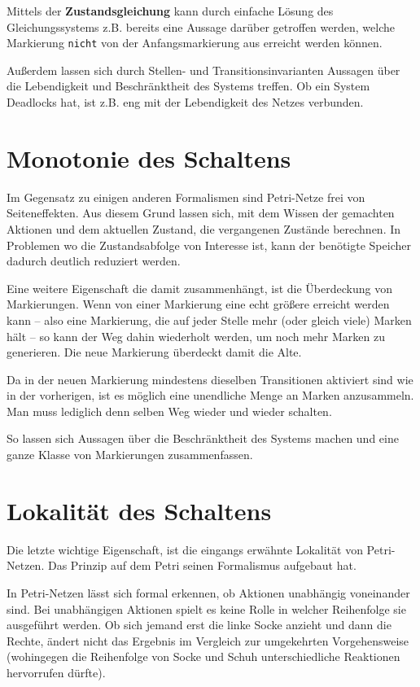 Mittels der \textbf{Zustandsgleichung} kann durch einfache Lösung des Gleichungssystems z.B. bereits eine Aussage darüber getroffen werden, welche Markierung \texttt{nicht} von der Anfangsmarkierung aus erreicht werden können.

Außerdem lassen sich durch Stellen- und Transitionsinvarianten Aussagen über die Lebendigkeit und Beschränktheit des Systems treffen.
Ob ein System Deadlocks hat, ist z.B. eng mit der Lebendigkeit des Netzes verbunden.

\section{Monotonie des Schaltens}
Im Gegensatz zu einigen anderen Formalismen sind Petri-Netze frei von Seiteneffekten.
Aus diesem Grund lassen sich, mit dem Wissen der gemachten Aktionen und dem aktuellen Zustand, die vergangenen Zustände berechnen.
In Problemen wo die Zustandsabfolge von Interesse ist, kann der benötigte Speicher dadurch deutlich reduziert werden.

Eine weitere Eigenschaft die damit zusammenhängt, ist die Überdeckung von Markierungen.
Wenn von einer Markierung eine echt größere erreicht werden kann -- also eine Markierung, die auf jeder Stelle mehr (oder gleich viele) Marken hält -- so kann der Weg dahin wiederholt werden, um noch mehr Marken zu generieren.
Die neue Markierung überdeckt damit die Alte.

Da in der neuen Markierung mindestens dieselben Transitionen aktiviert sind wie in der vorherigen, ist es möglich eine unendliche Menge an Marken anzusammeln.
Man muss lediglich denn selben Weg wieder und wieder schalten.

So lassen sich Aussagen über die Beschränktheit des Systems machen und eine ganze Klasse von Markierungen zusammenfassen.

\section{Lokalität des Schaltens}
Die letzte wichtige Eigenschaft, ist die eingangs erwähnte Lokalität von Petri-Netzen.
Das Prinzip auf dem Petri seinen Formalismus aufgebaut hat.

In Petri-Netzen lässt sich formal erkennen, ob Aktionen unabhängig voneinander sind.
Bei unabhängigen Aktionen spielt es keine Rolle in welcher Reihenfolge sie ausgeführt werden.
Ob sich jemand erst die linke Socke anzieht und dann die Rechte, ändert nicht das Ergebnis im Vergleich zur umgekehrten Vorgehensweise 
(wohingegen die Reihenfolge von Socke und Schuh unterschiedliche Reaktionen hervorrufen dürfte).

